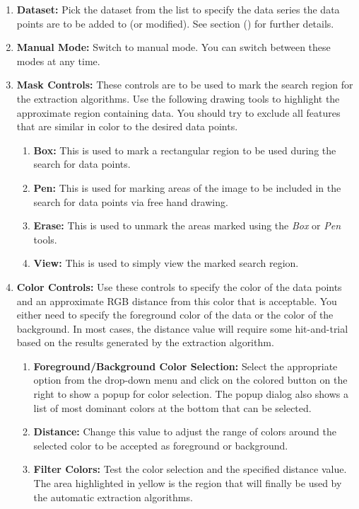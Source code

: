 \documentclass[letterpaper, 10pt]{article}
\begin{document}
\begin{enumerate}
\item{{\bf Dataset: }Pick the dataset from the list to specify the data series the data points are to be added to (or modified). See section () for further details.}
\item{{\bf Manual Mode: }Switch to manual mode. You can switch between these modes at any time.}
\item{{\bf Mask Controls:} These controls are to be used to mark the search region for the extraction algorithms. Use the following drawing tools to highlight the approximate region containing data. You should try to exclude all features that are similar in color to the desired data points.}
\begin{enumerate}
    \item{{\bf Box: }This is used to mark a rectangular region to be used during the search for data points.}
    \item{{\bf Pen: }This is used for marking areas of the image to be included in the search for data points via free hand drawing.}
    \item{{\bf Erase: }This is used to unmark the areas marked using the \emph{Box} or \emph{Pen} tools.}
    \item{{\bf View: }This is used to simply view the marked search region.}
\end{enumerate}
\item{{\bf Color Controls: } Use these controls to specify the color of the data points and an approximate RGB distance from this color that is acceptable. You either need to specify the foreground color of the data or the color of the background. In most cases, the distance value will require some hit-and-trial based on the results generated by the extraction algorithm.}
\begin{enumerate}
    \item{{\bf Foreground/Background Color Selection: }Select the appropriate option from the drop-down menu and click on the colored button on the right to show a popup for color selection. The popup dialog also shows a list of most dominant colors at the bottom that can be selected.}
    \item{{\bf Distance: }Change this value to adjust the range of colors around the selected color to be accepted as foreground or background.}
    \item{{\bf Filter Colors: }Test the color selection and the specified distance value. The area highlighted in yellow is the region that will finally be used by the automatic extraction algorithms.}

\end{enumerate}
\end{enumerate}
\end{document}

